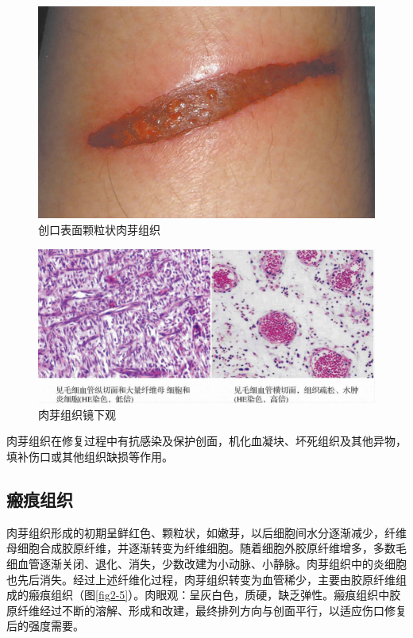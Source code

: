 \begin{figure}[!h]
	\begin{center}
        \includegraphics{./images/Image00026.jpg}
    \end{center}
    \captionsetup{justification=centering}
	\caption{创口表面颗粒状肉芽组织}
	\label{fig2-3} 
	\end{figure} 


\begin{figure}[!h]
	\begin{center}
        \includegraphics{./images/Image00027.jpg}
    \end{center}
    \captionsetup{justification=centering}
	\caption{肉芽组织镜下观}
	\label{fig2-4} 
	\end{figure}

肉芽组织在修复过程中有抗感染及保护创面，机化血凝块、坏死组织及其他异物，填补伤口或其他组织缺损等作用。

\subsection{瘢痕组织}

肉芽组织形成的初期呈鲜红色、颗粒状，如嫩芽，以后细胞间水分逐渐减少，纤维母细胞合成胶原纤维，并逐渐转变为纤维细胞。随着细胞外胶原纤维增多，多数毛细血管逐渐关闭、退化、消失，少数改建为小动脉、小静脉。肉芽组织中的炎细胞也先后消失。经过上述纤维化过程，肉芽组织转变为血管稀少，主要由胶原纤维组成的瘢痕组织（图\ref{fig2-5}）。肉眼观：呈灰白色，质硬，缺乏弹性。瘢痕组织中胶原纤维经过不断的溶解、形成和改建，最终排列方向与创面平行，以适应伤口修复后的强度需要。


